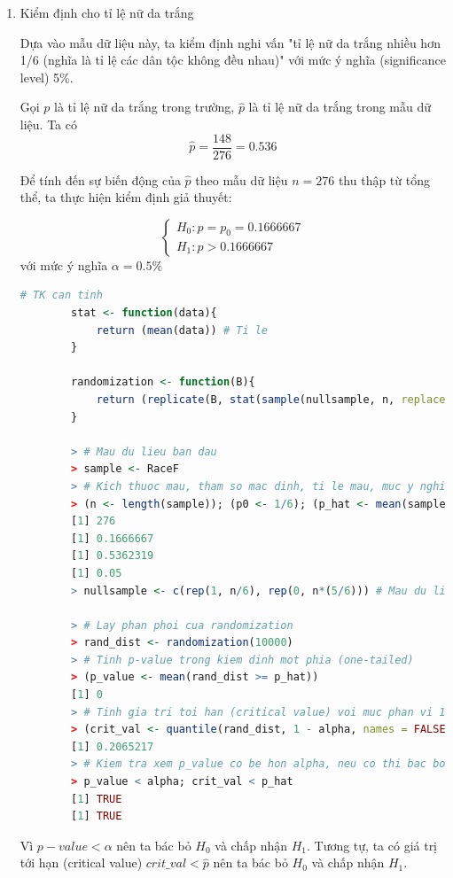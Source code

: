 \documentclass[a4paper,12pt]{article}
\begin{document}
	\begin{enumerate}[label = \alph*)]
		\item Kiểm định cho tỉ lệ nữ da trắng
		
		Dựa vào mẫu dữ liệu này, ta kiểm định nghi vấn "tỉ lệ nữ da trắng nhiều hơn 1/6 (nghĩa là tỉ lệ các dân tộc không đều nhau)" với mức ý nghĩa (significance level) 5\%.
		
		Gọi $p$ là tỉ lệ nữ da trắng trong trường, $\hat{p}$ là tỉ lệ nữ da trắng trong mẫu dữ liệu. Ta có
		$$\hat{p} = \frac{148}{276} = 0.536$$
		
		Để tính đến sự biến động của $\hat{p}$ theo mẫu dữ liệu $n = 276$ thu thập từ tổng thể, ta thực hiện kiểm định giả thuyết:
		
		\begin{equation*}
		\begin{cases}
		H_0: p = p_0 = 0.1666667\\
		H_1: p > 0.1666667
		\end{cases}
		\end{equation*}
		với mức ý nghĩa $\alpha = 0.5\%$
		
		\begin{lstlisting}[language=R]
		# TK can tinh
		stat <- function(data){
			return (mean(data)) # Ti le
		}
		
		randomization <- function(B){
			return (replicate(B, stat(sample(nullsample, n, replace = TRUE))))
		}
		
		> # Mau du lieu ban dau
		> sample <- RaceF
		> # Kich thuoc mau, tham so mac dinh, ti le mau, muc y nghia
		> (n <- length(sample)); (p0 <- 1/6); (p_hat <- mean(sample == "Caucasian")); (alpha <- 0.05)
		[1] 276
		[1] 0.1666667
		[1] 0.5362319
		[1] 0.05
		> nullsample <- c(rep(1, n/6), rep(0, n*(5/6))) # Mau du lieu tuong ung voi H0
		
		> # Lay phan phoi cua randomization
		> rand_dist <- randomization(10000)
		> # Tinh p-value trong kiem dinh mot phia (one-tailed)
		> (p_value <- mean(rand_dist >= p_hat))
		[1] 0
		> # Tinh gia tri toi han (critical value) voi muc phan vi 1-alpha
		> (crit_val <- quantile(rand_dist, 1 - alpha, names = FALSE))
		[1] 0.2065217
		> # Kiem tra xem p_value co be hon alpha, neu co thi bac bo H0
		> p_value < alpha; crit_val < p_hat
		[1] TRUE
		[1] TRUE
		\end{lstlisting}
		
		Vì $p-value < \alpha$ nên ta bác bỏ $H_0$ và chấp nhận $H_1$. Tương tự, ta có giá trị tới hạn (critical value) $crit\_val < \hat{p}$ nên ta bác bỏ $H_0$ và chấp nhận $H_1$. 
		

\end{enumerate}
\end{document}
